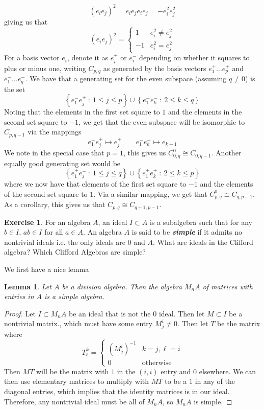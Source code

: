 \documentclass[psamsfonts]{amsart}
\newtheorem*{lem*}{Lemma}
\theoremstyle{definition}
\newtheorem{exer}[thm]{Exercise}
\theoremstyle{remark}
\newcommand{\ib}[1]{\textbf{\textit{#1}}}
\newcommand{\inv}{^{-1}}
\newcommand{\set}[1]{\left\lbrace #1 \right\rbrace}
\begin{document}
$$(e_ie_j)^2 = e_ie_je_ie_j = -e_i^2e_j^2 $$
giving us that 
$$(e_ie_j)^2 = \begin{cases} 
1 & e_i^2 \neq e_j^2 \\
-1 & e_i^2 = e_j^2
\end{cases}$$
For a basis vector $e_i$, denote it as $e_i^+$ or $e_i^-$ depending on whether it squares to plus or minus one, writing $C_{p,q}$ as generated by the basis vectors $e_1^+ \ldots e_p^+$ and $e_1^- \ldots e_q^-$. We have that a generating set for the even subspace (assuming $q \neq 0$) is the set 
$$\set{e_1^-e_j^+ ~:~ 1 \leq j \leq p} \cup \set{e_1^-e_k^- ~:~ 2 \leq k \leq q}$$
Noting that the elements in the first set square to $1$ and the elements in the second set square to $-1$, we get that the even subspace will be isomorphic to $C_{p,q-1}$ via the mappings
$$e_1^-e_j^+ \mapsto e_j^+ \qquad e_1^-e_k^- \mapsto e_{k-1}$$
We note in the special case that $p=1$, this gives us $C_{0,q}^0 \cong C_{0,q-1}$. Another equally good generating set would be
$$\set{e_1^+e_j^- ~:~ 1 \leq j \leq q} \cup \set{e_1^+e_k^+ ~:~ 2 \leq k \leq p} $$
where we now have that elements of the first set square to $-1$ and the elements of the second set square to $1$. Via a similar mapping, we get that $C_{p,q}^0 \cong C_{q,p-1}$. As a corollary, this gives us that $C_{p,q} \cong C_{q+1,p-1}$. 
%
\begin{exer}
For an algebra $A$, an ideal $I \subset A$ is a subalgebra such that for any $b \in I$, $ab \in I$ for all $a \in A$. An algebra $A$ is said to be \ib{simple} if it admits no nontrivial ideals i.e. the only ideals are $0$ and $A$. What are ideals in the Clifford algebra? Which Clifford Algebras are simple?
\end{exer}
We first have a nice lemma
%
\begin{lem*}
Let $A$ be a division algebra. Then the algebra $M_nA$ of matrices with entries in $A$ is a simple algebra.
\end{lem*}
%
\begin{proof}
Let $I \subset M_nA$ be an ideal that is not the $0$ ideal. Then let $M \subset I$ be a nontrivial matrix., which must have some entry $M^i_j \neq 0$. Then let $T$ be the matrix where
$$T^k_\ell = \begin{cases} 
(M^i_j)\inv & k = j, \ell= i \\
0 & \text{otherwise}
\end{cases} $$
Then $MT$ will be the matrix with $1$ in the $(i,i)$ entry and $0$ elsewhere. We can then use elementary matrices to multiply with $MT$ to be a $1$ in any of the diagonal entries, which implies that the identity matrices is in our ideal. Therefore, any nontrivial ideal must be all of $M_nA$, so $M_nA$ is simple.
\end{proof}
\end{document}
